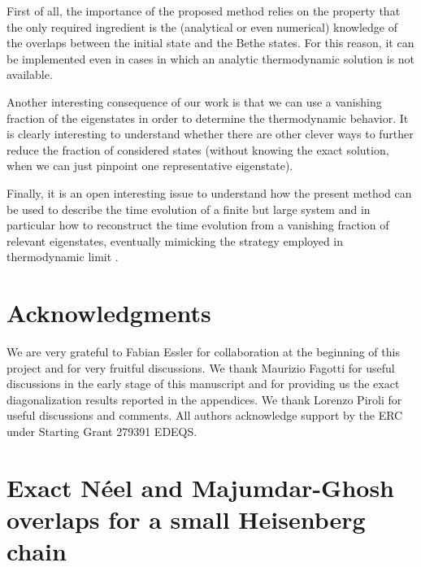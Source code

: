 \documentclass[11pt]{iopart}
\begin{document}
First of all, 
the importance of the proposed method relies on the property that the only required ingredient is the (analytical or even numerical)
knowledge of the overlaps between the initial state and the Bethe states. 
For this reason, it can be implemented even in cases in which an analytic thermodynamic solution is not 
available. 

Another interesting consequence of our work is that we can use a vanishing fraction of the eigenstates in order 
to determine the thermodynamic behavior. It is clearly interesting to understand whether there are other clever ways 
to further reduce the fraction of considered states (without knowing the exact solution, when we can just 
pinpoint one representative eigenstate). 

Finally, it is an open interesting issue to understand how the present method can be used to describe the time evolution 
of a finite but large system and in particular how to reconstruct the time evolution from a vanishing fraction of relevant 
eigenstates, eventually mimicking  the strategy employed in thermodynamic limit \cite{de-nardis-2015a,de-nardis-2015}. 


\section*{Acknowledgments}

We are very grateful to Fabian Essler for collaboration at the beginning of this project 
and for very fruitful discussions. 
We thank Maurizio Fagotti for useful discussions in the early stage of this manuscript 
and for providing us the exact diagonalization results reported in the appendices. 
We thank Lorenzo Piroli for useful discussions and comments. 
All authors acknowledge support by the ERC under Starting Grant 279391 EDEQS. 


\appendix


\section{Exact N\'eel and Majumdar-Ghosh overlaps for a small Heisenberg chain} 
\label{app-L12}
\end{document}

